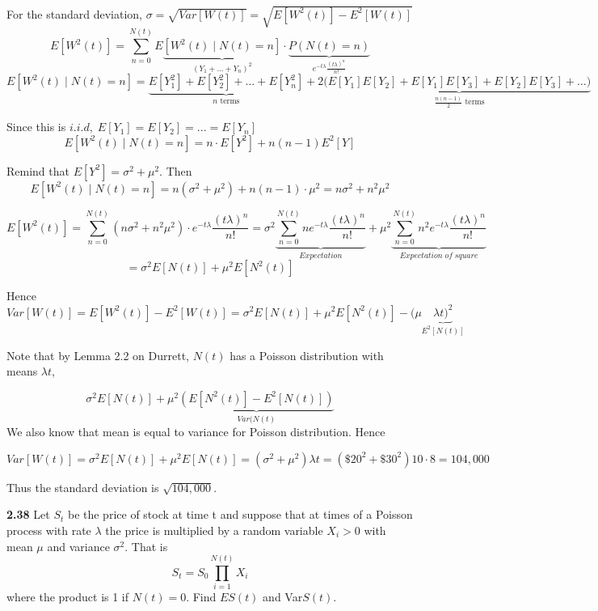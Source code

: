 \documentclass[12pt]{article}
\begin{document}
\vspace{2\baselineskip}
For the standard deviation, $\sigma = \sqrt{Var[{W(t)}]}= \sqrt{E[W^2(t)]-E^2[W(t)]}$
$$E[W^2(t)]= \sum\limits_{n=0}^{N(t)} E\underbrace{\left[W^2(t)\;|\;N(t)=n\right]}_{(Y_1+...+Y_n)^2} \cdot \underbrace{P(N(t)=n)}_{e^{-t\lambda}\frac{(t\lambda)^{n}}{n!}}$$
$$E[W^2(t)\;|\;N(t)=n] = \underbrace{E[Y_1^2]+E[Y_2^2]+\ldots+ E[Y_n^2]}_{n\text{ terms}}
+2(\underbrace{E[Y_1]E[Y_2]+E[Y_1]E[Y_3]+E[Y_2]E[Y_3]+\ldots)}_{\frac{n(n-1)}{2}\text{ terms}}$$

\vspace{1\baselineskip}
Since this is $i.i.d,\; E[Y_1]=E[Y_2]=...=E[Y_n]$
$$E[W^2(t)\;|\;N(t)=n]=n\cdot E[Y^2] + n(n-1) E^2[Y]$$

\vspace{1\baselineskip}
Remind that $E[Y^2] = \sigma^2 +\mu^2$. Then
$$E[W^2(t)\;|\;N(t)=n]=n(\sigma^2+\mu^2) + n(n-1)\cdot \mu^2 = n\sigma^2+n^2\mu^2$$

$$E[W^2(t)] 
= \sum\limits_{n=0}^{N(t)} (n\sigma^2+n^2\mu^2)\cdot e^{-t\lambda}\frac{(t\lambda)^{n}}{n!}
=\sigma^2 \underbrace{\sum\limits_{n=0}^{N(t)} n e^{-t\lambda}\frac{(t\lambda)^{n}}{n!}}_{Expectation}
+\mu^2 \underbrace{\sum\limits_{n=0}^{N(t)} n^2 e^{-t\lambda}\frac{(t\lambda)^{n}}{n!}}_{Expectation\; of\; square}$$
$$=\sigma^2 E[N(t)] + \mu^2 E[N^2(t)]$$

Hence
$$Var[W(t)] = E[W^2(t)] - E^2[W(t)] = \sigma^2 E[N(t)] + \mu^2 E[N^2(t)] - (\mu\underbrace{\lambda t)^2}_{E^2[N(t)]}$$

Note that by Lemma 2.2 on Durrett, $N(t)$ has a Poisson distribution with means $\lambda t$, 

$$\sigma^2 E[N(t)] + \mu^2 \underbrace{(E[N^2(t)] - E^2[N(t)])}_{Var(N(t)}
$$
We also know that mean is equal to variance for Poisson distribution. Hence

$$Var[W(t)]=\sigma^2 E[N(t)] + \mu^2 E[N(t)] = (\sigma^2 + \mu^2)\lambda t = (\$20^2 + \$30^2)10\cdot 8 = 104,000$$

\vspace{1\baselineskip}
Thus the standard deviation is $\sqrt{104,000}$.

\newpage
{\bf 2.38 } Let $S_t$ be the price of stock at time t and suppose that at times of a Poisson process with rate $\lambda$ the price is multiplied by a random variable $X_i > 0$ with mean $\mu$ and variance $\sigma^2$. That is $$S_t = S_0 \prod_{i=1}^{N(t)} X_i$$ where the product is 1 if $N(t)=0$. Find $ES(t)$ and Var$S(t)$. \\
\end{document}
